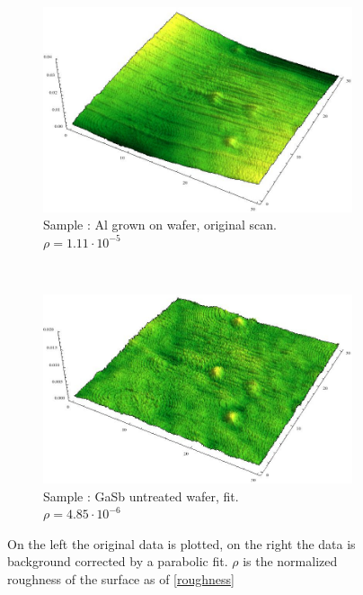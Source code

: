 \begin{figure}
    \begin{subfigure}{0.4\columnwidth}
         \includegraphics[width=\textwidth]{Bilder/s4_al_orig.jpg}
         \caption{Sample : Al grown on wafer, original scan.  $\rho = 
         1.11 \cdot 10^{-5}$}
        \label{s4_orig}
    \end{subfigure}
    ~
    \begin{subfigure}{0.4\columnwidth}
         \includegraphics[width=\textwidth]{Bilder/s4_al_f.jpg}
         \caption{Sample : GaSb untreated wafer, fit. \\  
         $\rho = 4.85 
         \cdot 10^{-6}$}
        \label{s3_flat}
    \end{subfigure}
\caption{On the left the original data is plotted, on the right the data is 
background corrected by a parabolic fit. $\rho$ is the normalized roughness of 
the surface as of \cref{roughness}}
\end{figure}


